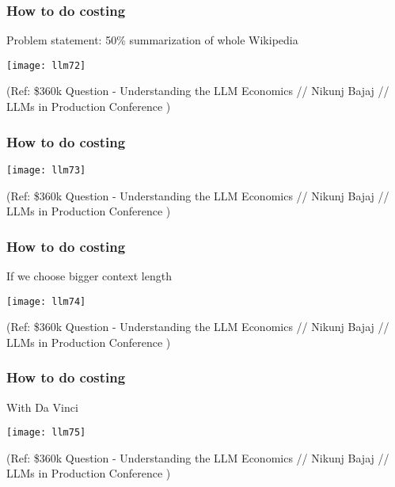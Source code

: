 \begin{frame}[fragile]\frametitle{How to do costing}

Problem statement: 50\% summarization of whole Wikipedia

\begin{center}
\texttt{[image: llm72]}
\end{center}		



{\tiny (Ref: \$360k Question - Understanding the LLM Economics // Nikunj Bajaj // LLMs in Production Conference )}

\end{frame}

\begin{frame}[fragile]\frametitle{How to do costing}


\begin{center}
\texttt{[image: llm73]}
\end{center}		



{\tiny (Ref: \$360k Question - Understanding the LLM Economics // Nikunj Bajaj // LLMs in Production Conference )}

\end{frame}

\begin{frame}[fragile]\frametitle{How to do costing}

If we choose bigger context length

\begin{center}
\texttt{[image: llm74]}
\end{center}		



{\tiny (Ref: \$360k Question - Understanding the LLM Economics // Nikunj Bajaj // LLMs in Production Conference )}

\end{frame}

\begin{frame}[fragile]\frametitle{How to do costing}

With Da Vinci

\begin{center}
\texttt{[image: llm75]}
\end{center}		



{\tiny (Ref: \$360k Question - Understanding the LLM Economics // Nikunj Bajaj // LLMs in Production Conference )}

\end{frame}

